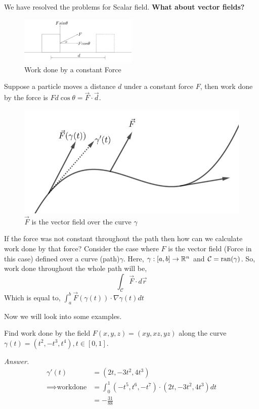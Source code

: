 \documentclass[../Analysis-3]{subfiles}
\begin{document}
We have resolved the problems for Scalar field. \textbf{What about vector fields?}
\begin{figure}[H]
    \centering
    \includegraphics[width=0.5\textwidth]{../figures/lec-23.2.png}
    \caption{Work done by a constant Force}
\end{figure}
Suppose a particle moves a distance $d$ under a constant force $F$, then work done by the force is $Fd\cos{\theta} = \vec{F}\cdot\vec{d}$.


\begin{figure}
    \centering
    \includegraphics[width=.98\linewidth]{../figures/lec-23.3.png}
    \caption{$\vec{F}$ is the vector field over the curve $\gamma$}
\end{figure}

If the force was not constant throughout the path then how can we calculate work done by that force?
Consider the case where $F$ is the vector field (Force in this case) defined over a curve (path)$\gamma$. Here, $\gamma : [a,b] \to \mathbb{R}^n$ and $\mathcal{C} = \operatorname{ran}(\gamma)$. So, work done throughout the whole path will be,
\[\int_{\mathcal{C}} \vec{F}\cdot d\vec{r}\]
Which is equal to, $\displaystyle\int_a^b \vec{F}(\gamma(t))\cdot \nabla \gamma(t) dt$

Now we will look into some examples.
\vspace{0.3cm}

\begin{Eg}{}{}
    Find work done by the field $F(x,y,z) = (xy,xz,yz)$ along the curve $\gamma(t) = (t^2,-t^3,t^4),t \in [0,1]$.

    \textit{Answer.} \begin{align*}
        \gamma'(t)
                                 & = (2t,-3t^2,4t^3)                                 \\
        \implies \text{workdone} & = \int_0^1 (-t^5,t^6,-t^7)\cdot(2t,-3t^2,4t^3) dt \\
                                 & = -\frac{31}{88}
    \end{align*}
\end{Eg}
\end{document}
